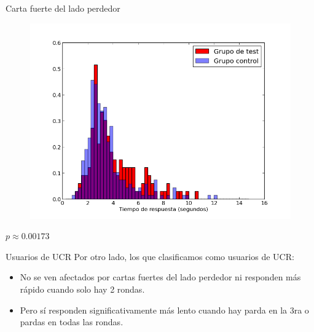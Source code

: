 \documentclass{beamer}
\begin{document}
\begin{frame}{Carta fuerte del lado perdedor}
  \begin{figure}
  	\includegraphics[width=0.8\linewidth]{graficos/10vs3.png}
  \end{figure}
  \begin{center}$p \approx 0.00173$
  \end{center}
\end{frame}

\begin{frame}{Usuarios de UCR}
Por otro lado, los que clasificamos como usuarios de UCR:
\begin{itemize}
\item No se ven afectados por cartas fuertes del lado perdedor ni responden más rápido cuando solo hay 2 rondas.
\item Pero sí responden significativamente más lento cuando hay parda en la 3ra o pardas en todas las rondas.
\end{itemize}
\end{frame}
\end{document}
